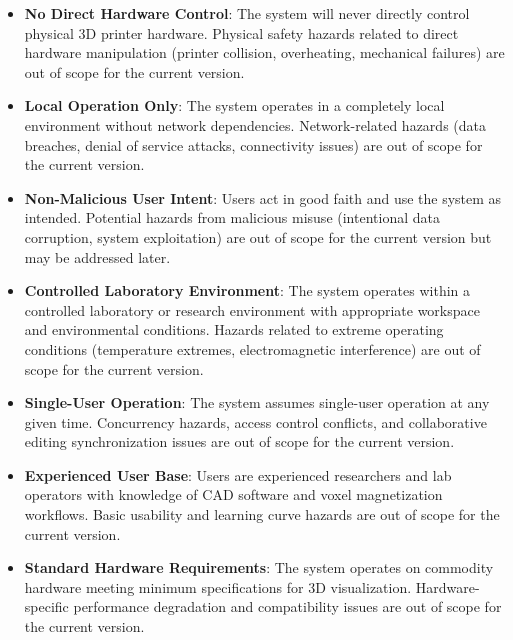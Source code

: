 \documentclass{article}
\begin{document}
\begin{itemize}
    \item \textbf{No Direct Hardware Control}: The system will never directly control physical 3D printer hardware. Physical safety hazards related to direct hardware manipulation (printer collision, overheating, mechanical failures) are out of scope for the current version.

    \item \textbf{Local Operation Only}: The system operates in a completely local environment without network dependencies. Network-related hazards (data breaches, denial of service attacks, connectivity issues) are out of scope for the current version.

    \item \textbf{Non-Malicious User Intent}: Users act in good faith and use the system as intended. Potential hazards from malicious misuse (intentional data corruption, system exploitation) are out of scope for the current version but may be addressed later.

    \item \textbf{Controlled Laboratory Environment}: The system operates within a controlled laboratory or research environment with appropriate workspace and environmental conditions. Hazards related to extreme operating conditions (temperature extremes, electromagnetic interference) are out of scope for the current version.

    \item \textbf{Single-User Operation}: The system assumes single-user operation at any given time. Concurrency hazards, access control conflicts, and collaborative editing synchronization issues are out of scope for the current version.

    \item \textbf{Experienced User Base}: Users are experienced researchers and lab operators with knowledge of CAD software and voxel magnetization workflows. Basic usability and learning curve hazards are out of scope for the current version.

    \item \textbf{Standard Hardware Requirements}: The system operates on commodity hardware meeting minimum specifications for 3D visualization. Hardware-specific performance degradation and compatibility issues are out of scope for the current version.
\end{itemize}


\iffalse
\wss{Include your FMEA table here. This is the most important part of this document.}
\wss{The safety requirements in the table do not have to have the prefix SR.
The most important thing is to show traceability to your SRS. You might trace to
requirements you have already written, or you might need to add new
requirements.}
\wss{If no safety requirement can be devised, other mitigation strategies can be
entered in the table, including strategies involving providing additional
documentation, and/or test cases.}
\fi
\end{document}
